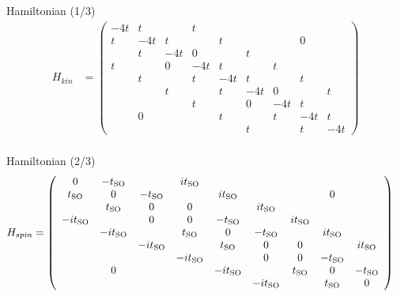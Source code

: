 \documentclass{beamer}
\newcommand{\inp}[1]{\ensuremath{\left(#1\right)}}
\newcommand{\tso}{\ensuremath{t_{\textnormal{SO}}}}
\begin{document}
\begin{frame}{Hamiltonian (1/3)}
    \small
    \begin{align*}
        H_{kin} &= \inp{
            \begin{array}{ccccccccc}
                -4t & t &  & t\\
                t & -4t & t &  & t &  &  & 0\\
                & t & -4t & 0 &  & t\\
                t &  & 0 & -4t & t &  & t\\
                & t &  & t & -4t & t &  & t\\
                &  & t &  & t & -4t & 0 &  & t\\
                &  &  & t &  & 0 & -4t & t\\
                & 0 &  &  & t &  & t & -4t & t\\
                &  &  &  &  & t &  & t & -4t\end{array}
        } \\
    \end{align*}
\end{frame}
\begin{frame}{Hamiltonian (2/3)}
    \footnotesize
    \begin{align*}
        H_{spin} &= \inp{
            \begin{array}{ccccccccc}
                0 & -\tso &  & i\tso\\
                \tso & 0 & -\tso &  & i\tso &  &  & 0\\
                & \tso & 0 & 0 &  & i\tso\\
                -i\tso &  & 0 & 0 & -\tso &  & i\tso\\
                & -i\tso &  & \tso & 0 & -\tso &  & i\tso\\
                &  & -i\tso &  & \tso & 0 & 0 &  & i\tso\\
                &  &  & -i\tso &  & 0 & 0 & -\tso\\
                & 0 &  &  & -i\tso &  & \tso & 0 & -\tso\\
                &  &  &  &  & -i\tso &  & \tso & 0
            \end{array}
        }
    \end{align*}
\end{frame}
\end{document}
